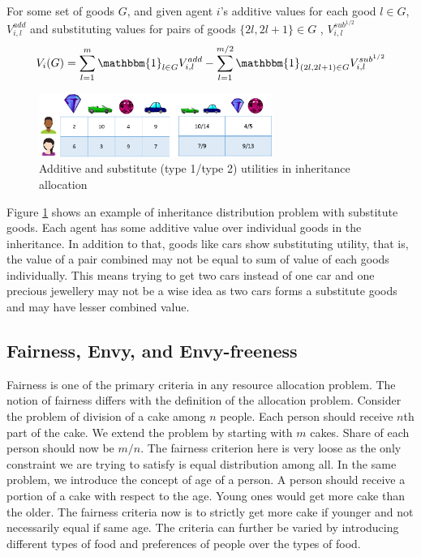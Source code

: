 For some set of goods $G$, and given agent $i$'s additive values for each good $l \in G$, $V_{i,l}^{add}$ and substituting values for pairs of goods $\{2l, 2l+1\} \in G$ , $V_{i,l}^{sub^{1/2}}$
\[
    V_i(G) = \sum_{l=1}^m \mathbbm{1}_{l \in G}V_{i,l}^{add} - \sum_{l=1}^{m/2} \mathbbm{1}_{\left(2l,2l+1\right) \in G}V_{i,l}^{sub^{1/2}}
\]

\begin{figure}
\includegraphics[width=3in]{images/substitute_values.png}
\caption{Additive and substitute (type 1/type 2) utilities in inheritance allocation}
\label{fig_inherit_subst_val_ex}
\end{figure}

Figure \ref{fig_inherit_subst_val_ex} shows an example of inheritance distribution problem with substitute goods. Each agent has some additive value over individual goods in the inheritance. In addition to that, goods like cars show substituting utility, that is, the value of a pair combined may not be equal to sum of value of each goods individually. This means trying to get two cars instead of one car and one precious jewellery may not be a wise idea as two cars forms a substitute goods and may have lesser combined value.


\subsection{Fairness, Envy, and Envy-freeness}
\label{section_envy}
Fairness is one of the primary criteria in any resource allocation problem. The notion of fairness differs with the definition of the allocation problem. Consider the problem of division of a cake among $n$ people. Each person should receive $n$th part of the cake. We extend the problem by starting with $m$ cakes. Share of each person should now be $m/n$. The fairness criterion here is very loose as the only constraint we are trying to satisfy is equal distribution among all. In the same problem, we introduce the concept of age of a person. A person should receive a portion of a cake with respect to the age. Young ones would get more cake than the older. The fairness criteria now is to strictly get more cake if younger and not necessarily equal if same age. The criteria can further be varied by introducing different types of food and preferences of people over the types of food.

